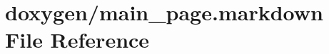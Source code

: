 \hypertarget{main__page_8markdown}{}\section{doxygen/main\+\_\+page.markdown File Reference}
\label{main__page_8markdown}
